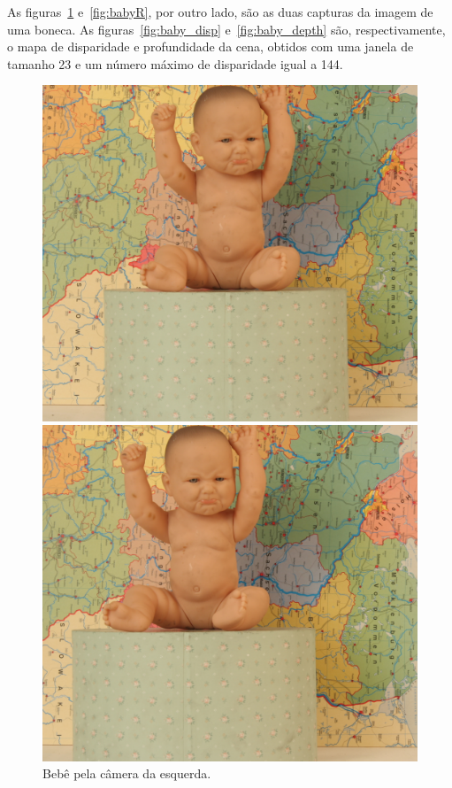 \documentclass{bmvc2k}
\begin{document}
As figuras~\ref{fig:babyL} e~\ref{fig:babyR}, por outro lado, são as duas capturas da imagem de uma boneca. As figuras~\ref{fig:baby_disp} e~\ref{fig:baby_depth} são, respectivamente, o mapa de disparidade e profundidade da cena, obtidos com uma janela de tamanho 23 e um número máximo de disparidade igual a 144.

\begin{figure}[htb]
\centering
\begin{minipage}[t]{0.2\textwidth}
  \centering
  \includegraphics[width=\linewidth]{figs/babyL.png}
  \caption{Bebê pela câmera da esquerda.}
  \label{fig:babyL}
\end{minipage}\hfill
\begin{minipage}[t]{0.2\textwidth}
  \centering
  \includegraphics[width=\linewidth]{figs/babyR.png}

\end{minipage}
\end{figure}
\end{document}
